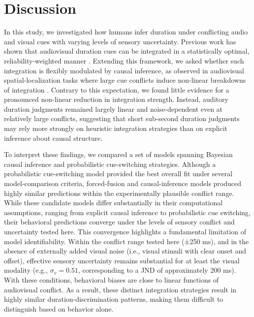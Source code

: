 \documentclass[9pt,lineno,doublespacing]{elife}
\begin{document}
\section{Discussion}
In this study, we investigated how humans infer duration under conflicting audio and visual cues with varying levels of sensory uncertainty. Previous work has shown that audiovisual duration cues can be integrated in a statistically optimal, reliability-weighted manner \citep{shams2005sound,hartcher2014duration}. Extending this framework, we asked whether such integration is flexibly modulated by causal inference, as observed in audiovisual spatial-localization tasks where large cue conflicts induce non-linear breakdowns of integration \citep{kording2007causal, badde2021causal,hong2021causal}. Contrary to this expectation, we found little evidence for a pronounced non-linear reduction in integration strength. Instead, auditory duration judgments remained largely linear and noise-dependent even at relatively large conflicts, suggesting that short sub-second duration judgments may rely more strongly on heuristic integration strategies than on explicit inference about causal structure.
 
To interpret these findings, we compared a set of models spanning Bayesian causal inference and probabilistic cue-switching strategies. Although a probabilistic cue-switching model provided the best overall fit under several model-comparison criteria, forced-fusion and causal-inference models produced highly similar predictions within the experimentally plausible conflict range. While these candidate models differ substantially in their computational assumptions, ranging from explicit causal inference to probabilistic cue switching, their behavioral predictions converge under the levels of sensory conflict and uncertainty tested here. This convergence highlights a fundamental limitation of model identifiability. Within the conflict range tested here (±250 ms), and in the absence of externally added visual noise (i.e., visual stimuli with clear onset and offset), effective sensory uncertainty remains substantial for at least the visual modality (e.g., $\sigma_v = 0.51$, corresponding to a JND of approximately 200 ms). With these conditions, behavioral biases are close to linear functions of audiovisual conflict. As a result, these distinct integration strategies result in highly similar duration-discrimination patterns, making them difficult to distinguish based on behavior alone.
\end{document}
